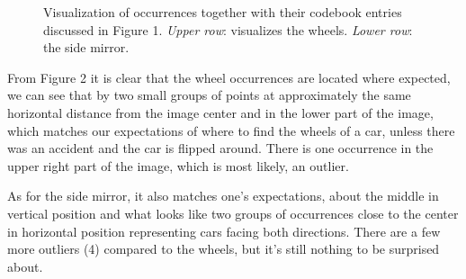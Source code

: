 \documentclass[12pt]{article}
\begin{document}
\begin{figure}[H]
	
	\caption{Visualization of occurrences together with their codebook entries discussed in Figure 1. \textit{Upper row}: visualizes the wheels. \textit{Lower row}: the side mirror. }
\end{figure}

From Figure 2 it is clear that the wheel occurrences are located where expected, we can see that by two small groups of points at approximately the same horizontal distance from the image center and in the lower part of the image, which matches our expectations of where to find the wheels of a car, unless there was an accident and the car is flipped around. There is one occurrence in the upper right part of the image, which is most likely, an outlier. 

As for the side mirror, it also matches one's expectations, about the middle in vertical position and what looks like two groups of occurrences close to the center in horizontal position representing cars facing both directions. There are a few more outliers (4) compared to the wheels, but it's still nothing to be surprised about.\\
\end{document}
